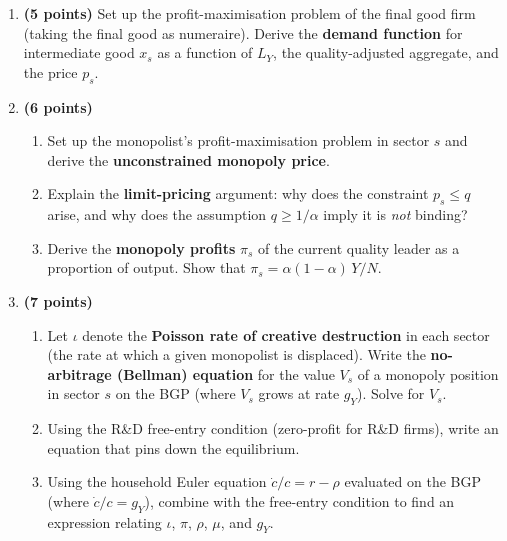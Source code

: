 \documentclass[a4paper,11pt]{article}
\begin{document}
\begin{enumerate}[label=\textbf{\arabic*.}, leftmargin=*, itemsep=6pt]

    \item \textbf{(5 points)} Set up the profit-maximisation problem of the final good firm
    (taking the final good as numeraire).  Derive the \textbf{demand function} for
    intermediate good $x_s$ as a function of $L_Y$, the quality-adjusted aggregate, and the
    price $p_s$.

    \item \textbf{(6 points)}
    \begin{enumerate}[label=(\alph*), itemsep=4pt]
        \item Set up the monopolist's profit-maximisation problem in sector $s$ and derive
        the \textbf{unconstrained monopoly price}.
        \item Explain the \textbf{limit-pricing} argument: why does the constraint
        $p_s \leq q$ arise, and why does the assumption $q \geq 1/\alpha$ imply it is
        \emph{not} binding?
        \item Derive the \textbf{monopoly profits} $\pi_s$ of the current quality leader as
        a proportion of output.  Show that $\pi_s = \alpha(1-\alpha)\,Y/N$.
    \end{enumerate}

    \item \textbf{(7 points)}
    \begin{enumerate}[label=(\alph*), itemsep=4pt]
        \item Let $\iota$ denote the \textbf{Poisson rate of creative destruction} in each
        sector (the rate at which a given monopolist is displaced).  Write the
        \textbf{no-arbitrage (Bellman) equation} for the value $V_s$ of a monopoly position
        in sector $s$ on the BGP (where $V_s$ grows at rate $g_Y$).  Solve for $V_s$.
        \item Using the R\&D free-entry condition (zero-profit for R\&D firms), write an
        equation that pins down the equilibrium.
        \item Using the household Euler equation $\dot{c}/c = r - \rho$ evaluated on the BGP
        (where $\dot{c}/c = g_Y$), combine with the free-entry condition to find an
        expression relating $\iota$, $\pi$, $\rho$, $\mu$, and $g_Y$.
    \end{enumerate}


\end{enumerate}
\end{document}
